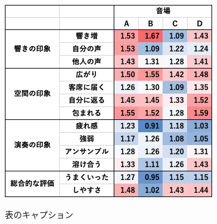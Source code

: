 \documentclass[11pt,a4j]{jreport}
\begin{document}

\clearpage
\begin{table}[H]
  \centering
  \begin{adjustbox}{width=.6\linewidth}
    \includegraphics{images/subjectiveExp/subjectiveStd.png}
  \end{adjustbox}
  \caption{表のキャプション}
  \label{table:1}
\end{table}


\end{document}
